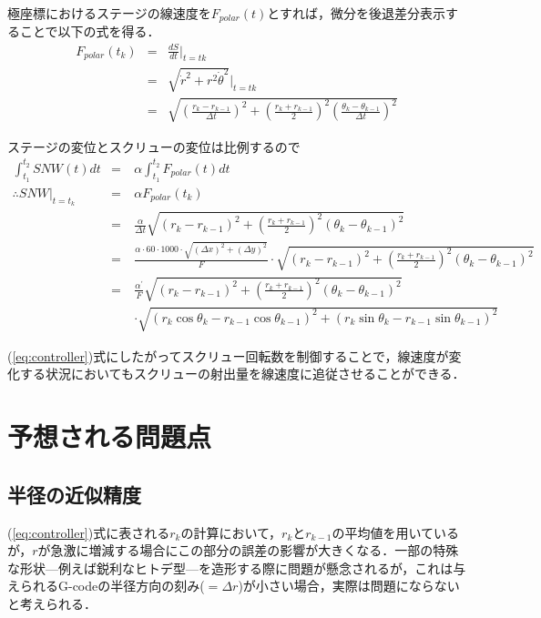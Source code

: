\documentclass[twocolumn,oneside,a4paper]{article}
\begin{document}
極座標におけるステージの線速度を$F_{polar}(t)$とすれば，微分を後退差分表示することで以下の式を得る．
\begin{eqnarray*}
F_{polar}(t_k) &=& \frac{d S}{d t}\Bigg|_{t=tk} \\
&=& \sqrt{\dot{r}^2+r^2 \dot{\theta}^2}\Big|_{t=tk} \\
&=& \sqrt{\left( \frac{r_k - r_{k-1}}{\Delta t} \right)^2 + \left(\frac{r_k+r_{k-1}}{2} \right)^2 \left( \frac{\theta_k - \theta_{k-1} }{\Delta t} \right)^2}	
\end{eqnarray*}

ステージの変位とスクリューの変位は比例するので
\begin{eqnarray}\label{eq:controller}
\int_{t_1}^{t_2} SNW(t)dt &=& \alpha \int_{t_1}^{t_2} F_{polar}(t) dt \nonumber \\
\therefore SNW\big|_{t=t_k} &=& \alpha F_{polar}(t_k)  \nonumber \\
&=& \frac{\alpha}{\Delta t} \sqrt{\left( r_k - r_{k-1} \right)^2 + \left(\frac{r_k+r_{k-1}}{2} \right)^2 \left( \theta_k - \theta_{k-1} \right)^2} \nonumber \\
&=& \frac{\alpha \cdot 60\cdot1000 \cdot \sqrt{(\Delta x)^2+(\Delta y)^2}}{F} \cdot \sqrt{\left( r_k - r_{k-1} \right)^2 + \left(\frac{r_k+r_{k-1}}{2} \right)^2  \left( \theta_k - \theta_{k-1} \right)^2} \nonumber \\
&=& \frac{\alpha^\prime}{F} \sqrt{\left( r_k - r_{k-1} \right)^2 + \left(\frac{r_k+r_{k-1}}{2} \right)^2  \left( \theta_k - \theta_{k-1} \right)^2 }  \nonumber \\
&\quad& \cdot \sqrt{ (r_k \cos\theta_k - r_{k-1} \cos\theta_{k-1})^2+(r_k \sin\theta_k - r_{k-1} \sin\theta_{k-1})^2 }
\end{eqnarray}

(\ref{eq:controller})式にしたがってスクリュー回転数を制御することで，線速度が変化する状況においてもスクリューの射出量を線速度に追従させることができる．
\clearpage

\section{予想される問題点}
\subsection{半径の近似精度} 
(\ref{eq:controller})式に表される$r_k$の計算において，$r_k$と$r_{k-1}$の平均値を用いているが，$r$が急激に増減する場合にこの部分の誤差の影響が大きくなる．一部の特殊な形状—例えば鋭利なヒトデ型—を造形する際に問題が懸念されるが，これは与えられるG-codeの半径方向の刻み($ = \Delta r$)が小さい場合，実際は問題にならないと考えられる．
\end{document}
